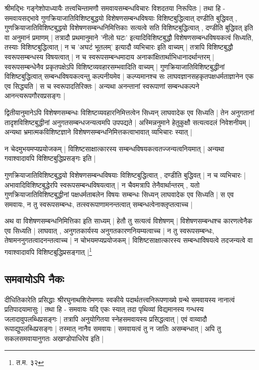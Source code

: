 श्रीमद्भिः गङ्गेशोपाध्यायैः तत्त्वचिन्तामणौ समवायसम्बन्धविचारः विशदतया निरूपितः | तथा हि - समवायसद्भावे  गुणक्रियाजातिविशिष्टबुद्धयो विशेषणसम्बन्धविषयाः विशिष्टबुद्धित्वात् दण्डीति बुद्धिवत् , गुणक्रियाजातिविशिष्टबुद्धयो विशेषणसम्बन्धनिमित्तिकाः सत्यत्वे सति विशिष्टबुद्धित्वात् , दण्डीति बुद्धिवत् इति वा अनुमानं  प्रमाणम् | तत्रादौ प्रथमानुमाने 'नीलो घटः' इत्यादिविशिष्टबुद्धौ विशेषणसम्बन्धविषयकत्वं सिध्यति, तस्याः विशिष्टबुद्धित्वात् | न च 'अघटं भूतलम्' इत्यादौ व्यभिचारः इति वाच्यम् | तत्रापि विशिष्टबुद्धौ स्वरूपसम्बन्धस्य विषयत्वात् | न च स्वरूपसम्बन्धमादाय अनाकांक्षितार्थाभिधानादर्थान्तरम् | स्वरूपसम्बन्धेनैव प्रकृतपक्षेऽपि विशिष्टव्यवहारसम्भवादिति वाच्यम् | गुणक्रियाजातिविशिष्टबुद्धीनां विशिष्टबुद्धित्वात् सम्बन्धविषयकत्वन्तु कल्पनीयमेव | कल्प्यमानश्च सः लाघवज्ञानसहकृतपक्षधर्मताज्ञानेन एक एव सिद्ध्यति | स च स्वरूपादतिरिक्तः | अन्यथा अनन्तानां स्वरूपाणां सम्बन्धकल्पने आनन्त्यरूपगौरवप्रसङ्गः |

द्वितीयानुमानेऽपि विशेषणसम्बन्धः विशिष्टव्यवहारनिमित्तत्वेन सिध्यन् लाघवादेक एव सिध्यति | तेन अनुगतानां तादृशविशिष्टबुद्धीनां अनुगतसम्बन्धजन्यत्वमपि उपपद्यते | अस्मिन्ननुमाने हेतुकुक्षौ सत्यत्वदलं निवेशनीयम् | अन्यथा भ्रमात्मकविशिष्टज्ञाने विशेषणसम्बन्धनिमित्तकत्वाभावात् व्यभिचारः स्यात् | 

न चेदमुभयमप्यप्रयोजकम् | विशिष्टसाक्षात्कारस्य सम्बन्धविषयकत्वतज्जन्यत्वनियमात् | अन्यथा गवाश्वादावपि विशिष्टबुद्धिप्रसङ्गः इति |

{\fontsize{11.7}{0}\selectfont\s  गुणक्रियाजातिविशिष्टबुद्धयो विशेषणसम्बन्धविषयाः विशिष्टबुद्धित्वात् , दण्डीति बुद्धिवत् | न च व्यभिचारः | अभावादिविशिष्टबुद्धेरपि स्वरूपसम्बन्धविषयत्वात् | न चैवमत्रापि तेनैवार्थान्तरम् , यतो गुणक्रियाजातिविशिष्टबुद्धीनां पक्षधर्मताबलेन विषयः सम्बन्धः सिध्यन् लाघवादेक एव सिध्यति | स एव समवायः, न तु स्वरूपसम्बन्धः, तत्स्वरूपाणामनन्तत्वात् सम्बन्धत्वेनाक्लृप्तत्वाच्च |}

{\fontsize{11.7}{0}\selectfont\s   अथ वा विशेषणसम्बन्धनिमित्तिका इति साध्यम् | हेतौ तु सत्यत्वं विशेषणम् | विशेषणसम्बन्धश्च कारणत्वेनैक एव सिध्यति | लाघवात् , अनुगतकार्यस्य अनुगतकारणनियम्यत्वाच्च | न तु स्वरूपसम्बन्धः, तेषामननुगतत्वादनन्तत्वाच्च | न चोभयमप्यप्रयोजकम् | विशिष्टसाक्षात्कारस्य सम्बन्धाविषयत्वे तदजन्यत्वे वा गवाश्वादावपि विशिष्टबुद्धिप्रसङ्गात् |\footnote{त.म. ३२}}


\subsection{समवायोऽपि नैकः} 

दीधितिकारेति प्रसिद्धाः श्रीरघुनाथशिरोमणयः स्वकीये पदार्थतत्त्वनिरूपणाख्ये ग्रन्थे समवायस्य नानात्वं प्रतिपादयामासुः | तथा हि - समवायः यदि एकः स्यात् तदा पृथिव्यां विद्यमानस्य गन्धस्य जलादावुपलब्धिप्रसङ्गः | तत्रापि अनुयोगितया स्नेहसमवायस्य प्रसिद्धत्वात् | एवं वाय्वादौ रूपाद्युपलब्धिप्रसङ्गः | तस्मात् नानैव समवायः | समवायत्वं तु न जातिः असम्बन्धात् | अपि तु सकलसमवायानुगतः अखण्डोपाधिरेव इति |

